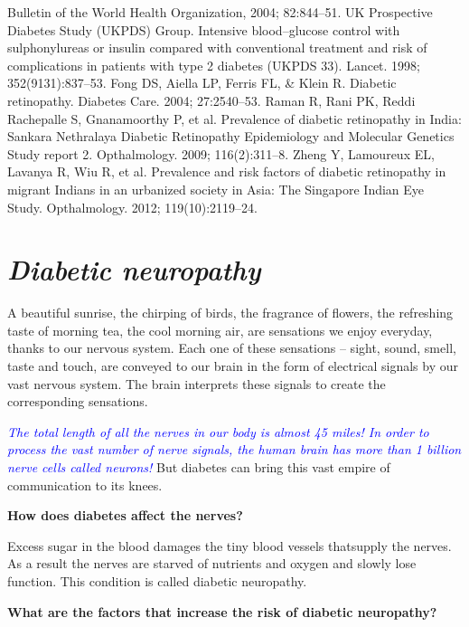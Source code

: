 \begin{thebibliography}{99}
 Bulletin of the World Health Organization, 2004; 82:844–51.
 UK Prospective Diabetes Study (UKPDS) Group. Intensive blood–glucose control with sulphonylureas or insulin compared with conventional treatment and risk of complications in patients with type 2 diabetes (UKPDS 33). Lancet. 1998; 352(9131):837–53.
 Fong DS, Aiella LP, Ferris FL, \& Klein R. Diabetic retinopathy. Diabetes Care. 2004; 27:2540–53.
 Raman R, Rani PK, Reddi Rachepalle S, Gnanamoorthy P, et al. Prevalence of diabetic retinopathy in India: Sankara Nethralaya Diabetic Retinopathy Epidemiology and Molecular Genetics Study report 2. Opthalmology. 2009; 116(2):311–8.
 Zheng Y, Lamoureux EL, Lavanya R, Wiu R, et al. Prevalence and risk factors of diabetic retinopathy in migrant Indians in an urba\-nized society in Asia: The Singapore Indian Eye Study. Opthalmo\-logy. 2012; 119(10):2119–24.
\end{thebibliography}


\chapter{\textit{Diabetic neuropathy}}\label{chap16}

A beautiful sunrise, the chirping of birds, the fragrance of flowers, the refreshing taste of morning tea, the cool morning air, are sensations we enjoy everyday, thanks to our nervous system. Each one of these sensations – sight, sound, smell, taste and touch, are conveyed to our brain in the form of electrical signals by our vast nervous system. The brain interprets these signals to create the corresponding sensations.

\textcolor{blue}{\textit{The total length of all the nerves in our body is almost 45 miles! In order to process the vast number of nerve signals, the human brain has more than 1 billion nerve cells called neurons!}} But diabetes can bring this vast empire of communication to its knees.

\noindent\textbf{How does diabetes affect the nerves?}

Excess sugar in the blood damages the tiny blood vessels that\break supply the nerves. As a result the nerves are starved of nutrients and oxygen and slowly lose function. This condition is called diabetic neuropathy.

\noindent\textbf{What are the factors that increase the risk of diabetic neuropathy?}

